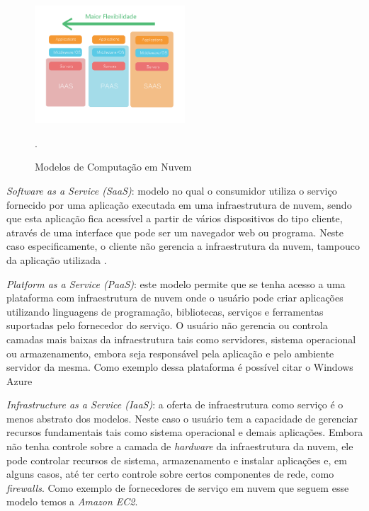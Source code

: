 \begin{figure}[htb]
	\caption{\label{fig:cloud_en}Modelos de Computação em Nuvem}
	\begin{center}
		\includegraphics[width=0.50\textwidth]{img/cloud_en.png}
	\end{center}
	.
\end{figure}


\textit{Software as a Service (SaaS)}: modelo no qual o consumidor utiliza o serviço fornecido por uma aplicação executada em uma infraestrutura de nuvem, sendo que esta aplicação fica acessível a partir de vários dispositivos do tipo cliente, através de uma interface que pode ser um navegador web ou programa. Neste caso especificamente, o cliente não gerencia a infraestrutura da nuvem, tampouco da aplicação utilizada \cite{mell2011nist}. 

\textit{Platform as a Service (PaaS)}: este modelo permite que se tenha acesso a uma plataforma com infraestrutura de nuvem onde o usuário pode criar aplicações utilizando linguagens de programação, bibliotecas, serviços e ferramentas suportadas pelo fornecedor do serviço. O usuário não gerencia ou controla camadas mais baixas da infraestrutura tais como servidores, sistema operacional ou armazenamento, embora seja responsável pela aplicação e pelo ambiente servidor da mesma\cite{mell2011nist}. Como exemplo dessa plataforma é possível citar o Windows Azure \cite{Azure}

\textit{Infrastructure as a Service (IaaS)}: a oferta de infraestrutura como serviço é o menos abstrato dos modelos. Neste caso o usuário tem a capacidade de gerenciar recursos fundamentais tais como sistema operacional e demais aplicações. Embora não tenha controle sobre a camada de \textit{hardware} da infraestrutura da nuvem, ele pode controlar recursos de sistema, armazenamento e instalar aplicações e, em alguns casos, até ter certo controle sobre certos componentes de rede, como \textit{firewalls}\cite{zhang2010cloud}. Como exemplo de fornecedores de serviço em nuvem que seguem esse modelo temos a \textit{Amazon EC2}\cite{AmazonEC2}. 

